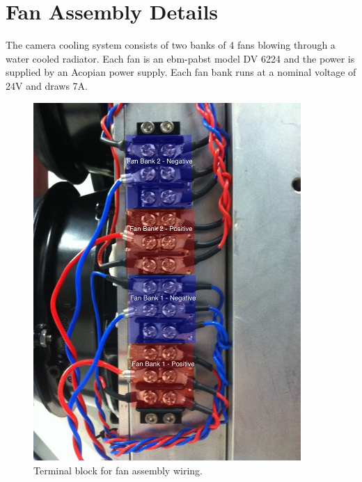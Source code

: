 \documentclass[11pt]{article}
\begin{document}
\section{Fan Assembly Details}

The camera cooling system consists of two banks of 4 fans blowing through a water cooled radiator.
Each fan is an ebm-pabst model DV 6224 and the power is supplied by an Acopian power supply.
Each fan bank runs at a nominal voltage of 24V and draws 7A.


\begin{figure}[h]
\begin{center}
\includegraphics[width = 4in]{fanWiring.jpg}
\caption{Terminal block for fan assembly wiring.}  
\label{fd2}
\end{center}
\end{figure}
\end{document}
